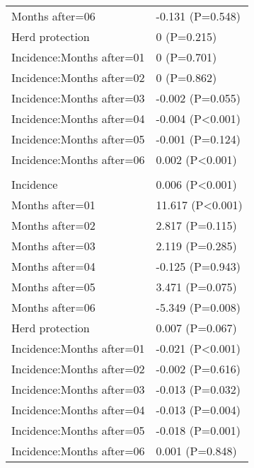 \documentclass[]{article}
\begin{document}
\begin{longtable}[t]{ll}
\hspace{1em}Months after=06 & -0.131 (P=0.548)\\
\hspace{1em}Herd protection & 0 (P=0.215)\\
\hspace{1em}Incidence:Months after=01 & 0 (P=0.701)\\
\hspace{1em}Incidence:Months after=02 & 0 (P=0.862)\\
\hspace{1em}Incidence:Months after=03 & -0.002 (P=0.055)\\
\hspace{1em}Incidence:Months after=04 & -0.004 (P<0.001)\\
\hspace{1em}Incidence:Months after=05 & -0.001 (P=0.124)\\
\hspace{1em}Incidence:Months after=06 & 0.002 (P<0.001)\\
\addlinespace[1.5em]
\multicolumn{2}{l}{\textbf{Temporary not field worker}}\\
\hspace{1em}Incidence & 0.006 (P<0.001)\\
\hspace{1em}Months after=01 & 11.617 (P<0.001)\\
\hspace{1em}Months after=02 & 2.817 (P=0.115)\\
\hspace{1em}Months after=03 & 2.119 (P=0.285)\\
\hspace{1em}Months after=04 & -0.125 (P=0.943)\\
\hspace{1em}Months after=05 & 3.471 (P=0.075)\\
\hspace{1em}Months after=06 & -5.349 (P=0.008)\\
\hspace{1em}Herd protection & 0.007 (P=0.067)\\
\hspace{1em}Incidence:Months after=01 & -0.021 (P<0.001)\\
\hspace{1em}Incidence:Months after=02 & -0.002 (P=0.616)\\
\hspace{1em}Incidence:Months after=03 & -0.013 (P=0.032)\\
\hspace{1em}Incidence:Months after=04 & -0.013 (P=0.004)\\
\hspace{1em}Incidence:Months after=05 & -0.018 (P=0.001)\\
\hspace{1em}Incidence:Months after=06 & 0.001 (P=0.848)\\*
\end{longtable}
\end{document}
